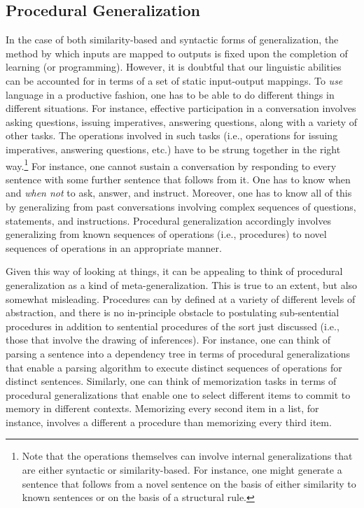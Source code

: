 \subsection{Procedural Generalization}

In the case of both similarity-based and syntactic forms of generalization, the method by which inputs are mapped to outputs is fixed upon the completion of learning (or programming). However, it is doubtful that our linguistic abilities can be accounted for in terms of a set of static input-output mappings. To \textit{use} language in a productive fashion, one has to be able to do different things in different situations. For instance, effective participation in a conversation involves asking questions, issuing imperatives, answering questions, along with a variety of other tasks. The operations involved in such tasks (i.e., operations for issuing imperatives, answering questions, etc.) have to be strung together in the right way.\footnote{Note that the operations themselves can involve internal generalizations that are either syntactic or similarity-based. For instance, one might generate a sentence that follows from a novel sentence on the basis of either similarity to known sentences or on the basis of a structural rule.} For instance, one cannot sustain a conversation by responding to every sentence with some further sentence that follows from it. One has to know when and \textit{when not} to ask, answer, and instruct. Moreover, one has to know all of this by generalizing from past conversations involving complex sequences of questions, statements, and instructions. Procedural generalization accordingly involves generalizing from known sequences of operations (i.e., procedures) to novel sequences of operations in an appropriate manner.
 
Given this way of looking at things, it can be appealing to think of procedural generalization as a kind of meta-generalization. This is true to an extent, but also somewhat misleading. Procedures can by defined at a variety of different levels of abstraction, and there is no in-principle obstacle to postulating sub-sentential procedures in addition to sentential procedures of the sort just discussed (i.e., those that involve the drawing of inferences). For instance, one can think of parsing a sentence into a dependency tree in terms of procedural generalizations that enable a parsing algorithm to execute distinct sequences of operations for distinct sentences. Similarly, one can think of memorization tasks in terms of procedural generalizations that enable one to select different items to commit to memory in different contexts. Memorizing every second item in a list, for instance, involves a different a procedure than memorizing every third item.

